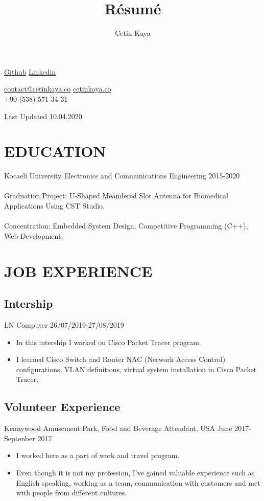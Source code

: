 \documentclass[10pt]{article}
\makeatletter
\renewcommand{\maketitle}{

\begin{center}

{\huge
\thetitle{
}
\vspace{0.7em}

}
{
\huge \bfseries
\theauthor}
\vspace{0.7em}

\faGithub\hspace{0.5em}\textcolor{Mycolor1}{\href{https://github.com/Zrrck?tab=repositories}{Github}}\hspace{0.5em}
\faLinkedin\hspace{0.5em}\textcolor{Mycolor1}{\href{https://www.linkedin.com/in/cetin-kaya/}{Linkedin}}\\\vspace{0.5em}

\faEnvelope \hspace{0.2em}\href{mailto:contact@cetinkaya.co}{contact@cetinkaya.co}\hspace{0.2em}
\faWordpress \hspace{0.2em}\textcolor{Mycolor1}{\href{http://cetinkaya.co}{cetinkaya.co}}\hspace{0.2em}\\
\vspace{0.5em}
\faPhoneSquare+90 (538) 571 34 31\vspace{1.em}



Last Updated 10.04.2020

\end{center}
}
\makeatother
\begin{document}
\title{R\'esum\'e}
\author{Cetin Kaya}
\maketitle



\vspace{5em}
\section{EDUCATION}
Kocaeli University Electronics and Communications Engineering \hspace{15.em} 2015-2020
\\ \\
Graduation Project: U-Shaped Meandered Slot Antenna for Biomedical Applications Using CST Studio.
\\ \\
Concentration: Embedded System Design, Competitive Programming (C++), Web Development.
\vspace{1em}
\section{JOB EXPERIENCE}
\vspace{1em}
\subsection{Intership}
LN Computer\hspace{30.em} 26/07/2019-27/08/2019
\begin{itemize}
\itemsep0em
\item In this intership I worked on Cisco Packet Tracer program. 
\item I learned  Cisco Switch and Router NAC (Nerwork Access Control) configurations, VLAN definitions, virtual system installation in Cisco Packet Tracer.
\end{itemize}

\vspace{1em}
\subsection{Volunteer Experience}
Kennywood Amusement Park, Food and Beverage Attendant, USA \hspace{6.em}June 2017-Septenber 2017

\begin{itemize}
\itemsep0em
\item I worked here as a part of work and travel program. 
\item Even though it is not my profession, I've gained valuable
experience such as English speaking, working as a team,
communication with customers and met with people from different
cultures.
\end{itemize}
\vspace{1em}
\end{document}
